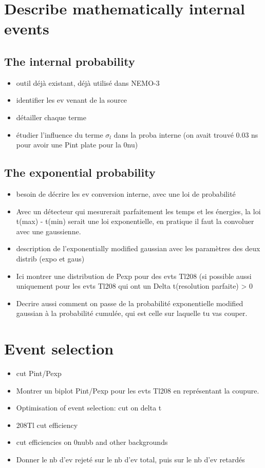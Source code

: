 \section{Describe mathematically internal events}

\subsection{The internal probability}
\begin{itemize}
\item outil déjà existant, déjà utilisé dans NEMO-$3$
\item identifier les ev venant de la source
\item détailler chaque terme
\item étudier l'influence du terme $\sigma_{l}$ dans la proba interne (on avait trouvé 0.03 ns pour avoir une Pint plate pour la 0nu)
\end{itemize}

\subsection{The exponential probability}
\begin{itemize}
\item besoin de décrire les ev conversion interne, avec une loi de probabilité
\item Avec un détecteur qui mesurerait parfaitement les temps et les énergies, la loi t(max) - t(min) serait une loi exponentielle, en pratique il faut la convoluer avec une gaussienne.
\item description de l'exponentially modified gaussian avec les paramètres des deux distrib (expo et gaus)
\item Ici montrer une distribution de Pexp pour des evts Tl208 (si possible aussi uniquement pour les evts Tl208 qui ont un Delta t(resolution parfaite) > 0
\item Decrire aussi comment on passe de la probabilité exponentielle modified gaussian à la probabilité cumulée, qui est celle sur laquelle tu vas couper.
\end{itemize}

\section{Event selection}
\begin{itemize}
\item cut Pint/Pexp
\item Montrer un biplot Pint/Pexp pour les evts Tl208 en représentant la coupure.
\item Optimisation of event selection: cut on delta t
\item 208Tl cut efficiency
\item cut efficiencies on 0nubb and other backgrounds
\item Donner le nb d'ev rejeté sur le nb d'ev total, puis sur le nb d'ev retardés
\end{itemize}

